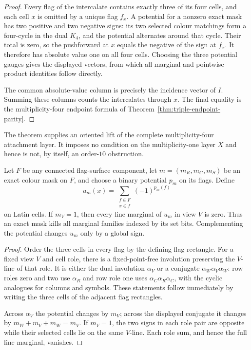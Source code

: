 \begin{proof}
Every flag of the intercalate contains exactly three of its four cells, and
each cell $x$ is omitted by a unique flag $f_x$.  A potential for a nonzero
exact mask has two positive and two negative signs: its two selected colour
matchings form a four-cycle in the dual $K_4$, and the potential alternates
around that cycle.  Their total is zero, so
the pushforward at $x$ equals the negative of the sign at $f_x$.  It
therefore has absolute value one on all four cells.  Choosing the three
potential gauges gives the displayed vectors, from which all marginal and
pointwise-product identities follow directly.

The common absolute-value column is precisely the incidence vector of $I$.
Summing these columns counts the intercalates through $x$.  The final equality
is the multiplicity-four endpoint formula of
Theorem~\ref{thm:triple-endpoint-parity}.
\end{proof}

The theorem supplies an oriented lift of the complete multiplicity-four
attachment layer.  It imposes no condition on the multiplicity-one layer
$X$ and hence is not, by itself, an order-$10$ obstruction.

\begin{theorem}
\label{thm:exact-mask-cell-pushforward}
Let $F$ be any connected flag-surface component, let
$m=(m_R,m_C,m_S)$ be an exact colour mask on $F$, and choose a binary
potential $p_m$ on its flags.  Define
\[
 u_m(x)=\sum_{\substack{f\in F\\x\in f}}(-1)^{p_m(f)}
\]
on Latin cells.  If $m_V=1$, then every line marginal of $u_m$ in view $V$
is zero.  Thus an exact mask kills all marginal families indexed by its set
bits.  Complementing the potential changes $u_m$ only by a global sign.
\end{theorem}

\begin{proof}
Order the three cells in every flag by the defining flag rectangle.  For a
fixed view $V$ and cell role, there is a fixed-point-free involution preserving
the $V$-line of that role.  It is either the dual involution $\alpha_V$ or a
conjugate $\alpha_W\alpha_V\alpha_W$: row roles zero and two use $\alpha_R$
and row role one uses $\alpha_C\alpha_R\alpha_C$, with the cyclic analogues
for columns and symbols.  These statements follow immediately by writing the
three cells of the adjacent flag rectangles.

Across $\alpha_V$ the potential changes by $m_V$; across the displayed
conjugate it changes by $m_W+m_V+m_W=m_V$.  If $m_V=1$, the two signs in each
role pair are opposite while their selected cells lie on the same $V$-line.
Each role sum, and hence the full line marginal, vanishes.
\end{proof}


